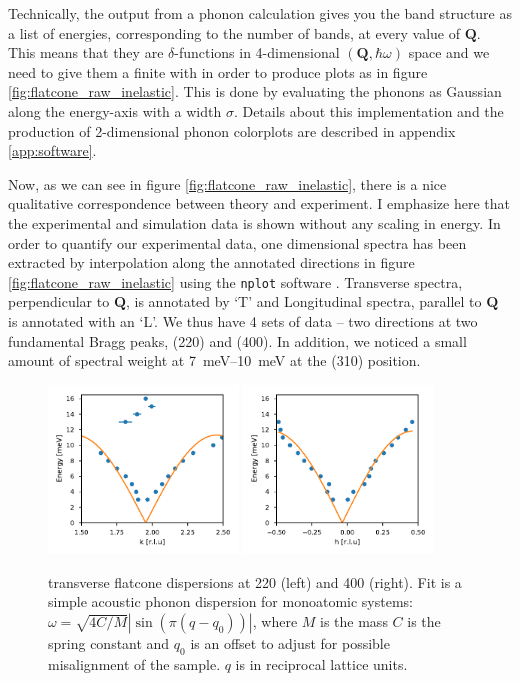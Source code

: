 Technically, the output from a phonon calculation gives you the band structure as a list of energies, corresponding to the number of bands, at every value of $\bm{Q}$. This means that they are $\delta$-functions in 4-dimensional $(\bm{Q},\hbar\omega)$ space and we need to give them a finite with in order to produce plots as in figure \ref{fig:flatcone_raw_inelastic}. This is done by evaluating the phonons as Gaussian along the energy-axis with a width $\sigma$. Details about this implementation and the production of 2-dimensional phonon colorplots are described in appendix \ref{app:software}.

Now, as we can see in figure \ref{fig:flatcone_raw_inelastic}, there is a nice qualitative correspondence between theory and experiment. I emphasize here that the experimental and simulation data is shown without any scaling in energy. In order to quantify our experimental data, one dimensional spectra has been extracted by interpolation along the annotated directions in figure \ref{fig:flatcone_raw_inelastic} using the \texttt{nplot} software \cite{nplot}. Transverse spectra, perpendicular to $\bm{Q}$, is annotated by `T' and Longitudinal spectra, parallel to $\bm{Q}$ is annotated with an `L'. We thus have 4 sets of data -- two directions at two fundamental Bragg peaks, (220) and (400). In addition, we noticed a small amount of spectral weight at \SIrange{7}{10}{\milli\eV} at the (310) position.

\begin{figure}
    \centering
    \includegraphics[width=0.45\textwidth]{fig/lowen/dispersion_220T.pdf}
    \includegraphics[width=0.45\textwidth]{fig/lowen/dispersion_400T.pdf}
    \caption[flatcone dispersion 220T/400T]{transverse flatcone dispersions at 220 (left) and 400 (right). Fit is a simple acoustic phonon dispersion for monoatomic systems: $\omega = \sqrt{4C/M} | \sin ( \pi (q-q_0) ) | $, where $M$ is the mass $C$ is the spring constant and $q_0$ is an offset to adjust for possible misalignment of the sample. $q$ is in reciprocal lattice units.}
    \label{fig:transverse_phonons_flatcone}
\end{figure}

